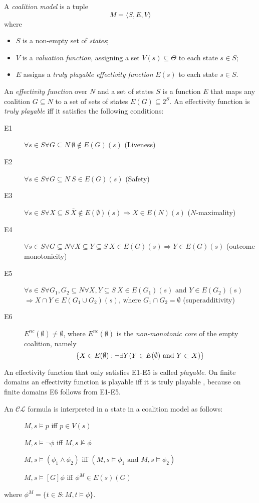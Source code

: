 \documentclass{article}
\newcommand{\acro}[1]{\ensuremath{\mathcal{#1}}}
\newcommand{\agents}{N}
\newcommand{\tuple}[1]{\langle #1\rangle}
\begin{document}
A \emph{coalition model} is a tuple
\[M = \tuple{S,E,V}\]
where 
\begin{itemize}
\item $S$ is a non-empty set of \emph{states};
\item $V$ is a \emph{valuation function}, assigning a set $V(s) \subseteq \Theta$ to each state $s\in S$;
\item $E$ assigns a \emph{truly playable effectivity function} $E(s)$ to each state
$s \in S$.
\end{itemize}
An \emph{effectivity function} \cite{pauly:2002a} over $\agents$ and a
set of states $S$ is a function $E$ that maps any coalition $G
\subseteq \agents$ to a set of sets of states $E(G) \subseteq 2^S$. An
effectivity function is \emph{truly playable}
\cite{pauly:2002a,goranko:2011} iff it satisfies the following
conditions:
\begin{description}
\item[E1] $\forall s \in S \forall G \subseteq N \ \emptyset \not \in E(G)(s)$ (Liveness)
\item[E2] $\forall s \in S \forall G \subseteq N \  S \in E(G)(s)$ (Safety)
\item[E3] $\forall s \in S \forall X \subseteq S \ \bar{X} \not \in E(\emptyset)(s) \Rightarrow X \in E(N)(s)$ ($N$-maximality)
\item[E4] $\forall s \in S \forall G \subseteq N \forall X \subseteq Y \subseteq S \ 
 X \in E(G)(s) \Rightarrow Y \in E(G)(s)$ (outcome monotonicity)
\item[E5]  $\forall s \in S \forall G_1,G_2 \subseteq N \forall X,Y \subseteq S\ X \in E(G_1)(s)$ and $Y \in E(G_2)(s)$
$\Rightarrow X \cap Y \in E(G_1 \cup G_2)(s)$, where $G_1 \cap G_2 = \emptyset$ (superadditivity)
\item[E6] $E^{nc}(\emptyset) \not = \emptyset$, where $E^{nc}(\emptyset)$ is
the \emph{non-monotonic core} of the empty coalition, namely
$$\{X \in E(\emptyset): \neg \exists Y (Y \in E(\emptyset)\ {\rm and}\ Y \subset X)\}$$
\end{description}
An effectivity function that only satisfies E1-E5 is called
\emph{playable}. On finite domains an effectivity function is playable
iff it is truly playable \cite{goranko:2011}, because on finite domains E6
follows from E1-E5.

An \acro{CL} formula is interpreted in a state in a coalition model as follows:
\begin{description}
\item[] $M,s \models p$ iff $p \in V(s)$
\item[] $M,s \models \neg \phi$ iff $M,s \not\models \phi$
\item[] $M,s \models (\phi_1 \wedge \phi_2)$ iff $(M,s \models \phi_1 \mbox{ and } M,s \models \phi_2)$
\item[] $M,s \models [G]\phi$ iff $\phi^{M} \in E(s)(G)$
\end{description}
where $\phi^{M} = \{t \in S: M,t \models \phi\}$.
\end{document}
